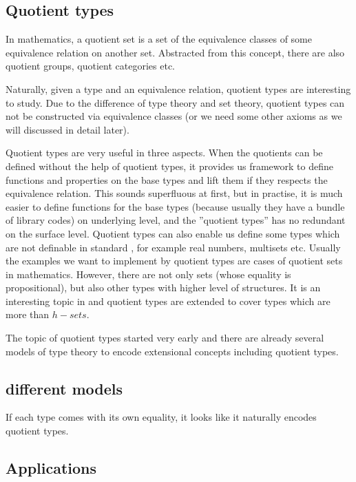 \subsection{Quotient types}


In mathematics, a quotient set is a set of the equivalence classes of
some equivalence relation on another set. Abstracted from this
concept, there are also quotient groups, quotient categories etc.

Naturally, given a type and an equivalence relation, quotient types
are interesting to study. Due to the difference of type theory and set
theory, quotient types can not be constructed via equivalence classes
(or we need some other axioms as we will discussed in detail
later).

Quotient types are very useful in three aspects. 
When the quotients
can be defined without the help of quotient types, it provides us
framework to define functions and properties on the base types and
lift them if they respects the equivalence relation. This sounds
superfluous at first, but in practise, it is much easier to define
functions for the base types (because usually they have a bundle of
library codes) on underlying level, and the ''quotient types'' has no
redundant on the surface level.
Quotient types can also enable us define some types which are not
definable in standard \itt, for example real numbers, multisets etc.
Usually the examples we want to implement by quotient types are cases
of quotient sets in mathematics. However, there are not only sets
(whose equality is propositional), but also other types with higher
level of structures. It is an interesting topic in \hott and quotient
types are extended to cover types which are more than $h-sets$.

The topic of quotient types started very early and there are already
several models of type theory to encode extensional concepts including
quotient types.

\subsection{different models}

If each type comes with its own equality, it looks like it naturally
encodes quotient types.





\subsection{Applications}

